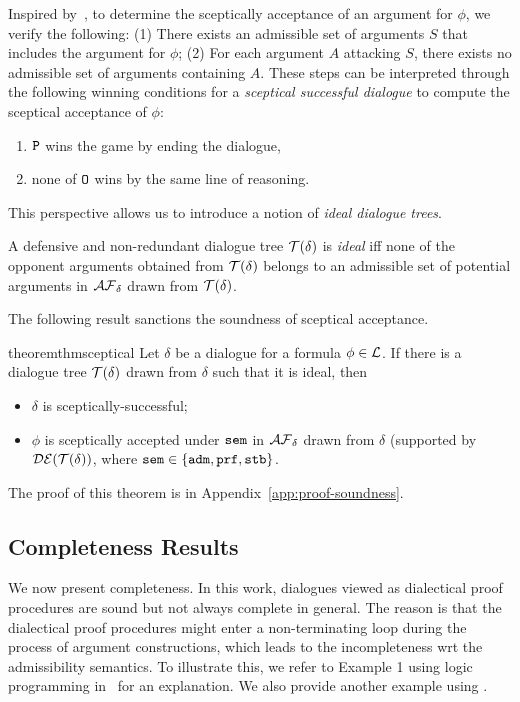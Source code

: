Inspired by~\cite{DUNG2007642}, to determine the sceptically acceptance of an argument for $\phi$, we verify the following:
(1) There exists an admissible set of arguments $S$ that includes the argument for $\phi$;
(2) For each argument $A$ attacking $S$, there exists no admissible set of arguments containing $A$.
These steps can be interpreted through the following winning conditions for a \emph{sceptical successful dialogue} to compute the sceptical acceptance of $\phi$:
\begin{enumerate}
    \item $\texttt{\textup{P}}$ wins the game by ending the dialogue,
    \item none of $\texttt{\textup{O}}$ wins by the same line of reasoning.
\end{enumerate}
This perspective allows us to introduce a notion of \emph{ideal dialogue trees}.

\begin{definition}
\label{def:tree-ideal}
     A defensive and non-redundant dialogue tree $\mathcal{T}(\delta)$ is \emph{ideal} iff none of the opponent arguments obtained from $\mathcal{T}(\delta)$ belongs to an admissible set of potential arguments in $ \mathcal{AF}_ \delta$ drawn from $\mathcal{T}(\delta)$.
\end{definition}

The following result sanctions the soundness of sceptical acceptance.

\begin{restatable} {theorem}{thmsceptical}
\label{thm:scep}
Let $\delta$ be a dialogue for a formula $\phi \in \mathcal{L}$. If there is a dialogue tree $\mathcal{T}(\delta)$ drawn from $\delta$ such that it is ideal, then
\begin{itemize}
    \item $\delta$ is sceptically-successful;
    \item $\phi$ is sceptically accepted under $\texttt{\textup{sem}}$ in $\mathcal{AF}_ \delta$ drawn from $\delta$ (supported by $\mathcal{DE}(\mathcal{T}(\delta))$, where $\texttt{\textup{sem}} \in \{\texttt{\textup{adm}}, \texttt{\textup{prf}}, \texttt{\textup{stb}}\}$.
\end{itemize} 
\end{restatable}
The proof of this theorem is in Appendix~\ref{app:proof-soundness}.

\subsection{Completeness Results}
\label{sec:completeness}
We now present completeness. 
In this work, dialogues viewed as dialectical proof procedures are sound but not always complete in general.
The reason is that the dialectical proof procedures might enter a non-terminating loop during the process of argument constructions, which leads to the incompleteness wrt the admissibility semantics.
To illustrate this, we refer to Example 1 using logic programming in~\cite{ThangDP22} for an explanation.
We also provide another example using \datalogPM.

